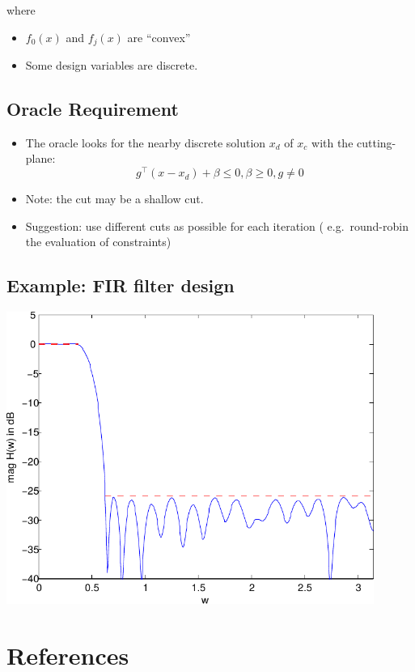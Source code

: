 \documentclass[]{article}
\providecommand{\tightlist}{%
  \setlength{\itemsep}{0pt}\setlength{\parskip}{0pt}}
\begin{document}
where

\begin{itemize}
\tightlist
\item
  \(f_0(x)\) and \(f_j(x)\) are ``convex''
\item
  Some design variables are discrete.
\end{itemize}

\hypertarget{oracle-requirement}{%
\subsection{Oracle Requirement}\label{oracle-requirement}}

\begin{itemize}
\item
  The oracle looks for the nearby discrete solution \(x_d\) of \(x_c\)
  with the cutting-plane:
  \[g^\top (x - x_d) + \beta \leq 0, \beta \geq 0, g \neq 0\]
\item
  Note: the cut may be a shallow cut.
\item
  Suggestion: use different cuts as possible for each iteration (
  e.g.~round-robin the evaluation of constraints)
\end{itemize}

\hypertarget{example-fir-filter-design-1}{%
\subsection{Example: FIR filter
design}\label{example-fir-filter-design-1}}

\includegraphics[width=0.9\textwidth,height=\textheight]{ellipsoid.files/lowpass_ripple.pdf}

\hypertarget{references}{%
\section*{References}\label{references}}
\end{document}
